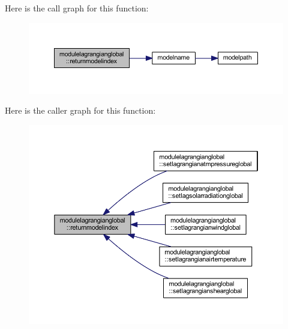 Here is the call graph for this function\+:\nopagebreak
\begin{figure}[H]
\begin{center}
\leavevmode
\includegraphics[width=350pt]{namespacemodulelagrangianglobal_a446618968d07df360f90a4ddc2d93a99_cgraph}
\end{center}
\end{figure}
Here is the caller graph for this function\+:\nopagebreak
\begin{figure}[H]
\begin{center}
\leavevmode
\includegraphics[width=350pt]{namespacemodulelagrangianglobal_a446618968d07df360f90a4ddc2d93a99_icgraph}
\end{center}
\end{figure}
\mbox{\label{namespacemodulelagrangianglobal_a8101ab80f9478c6164ad8c0d0261efd1}} 
